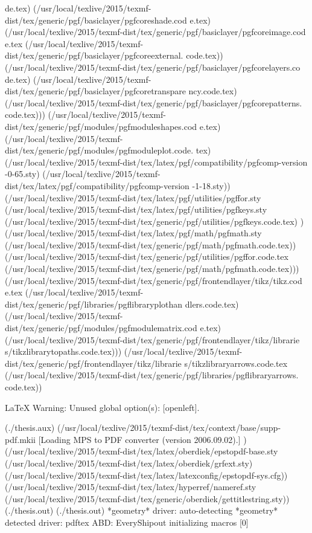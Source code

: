 de.tex)
(/usr/local/texlive/2015/texmf-dist/tex/generic/pgf/basiclayer/pgfcoreshade.cod
e.tex)
(/usr/local/texlive/2015/texmf-dist/tex/generic/pgf/basiclayer/pgfcoreimage.cod
e.tex
(/usr/local/texlive/2015/texmf-dist/tex/generic/pgf/basiclayer/pgfcoreexternal.
code.tex))
(/usr/local/texlive/2015/texmf-dist/tex/generic/pgf/basiclayer/pgfcorelayers.co
de.tex)
(/usr/local/texlive/2015/texmf-dist/tex/generic/pgf/basiclayer/pgfcoretranspare
ncy.code.tex)
(/usr/local/texlive/2015/texmf-dist/tex/generic/pgf/basiclayer/pgfcorepatterns.
code.tex)))
(/usr/local/texlive/2015/texmf-dist/tex/generic/pgf/modules/pgfmoduleshapes.cod
e.tex)
(/usr/local/texlive/2015/texmf-dist/tex/generic/pgf/modules/pgfmoduleplot.code.
tex)
(/usr/local/texlive/2015/texmf-dist/tex/latex/pgf/compatibility/pgfcomp-version
-0-65.sty)
(/usr/local/texlive/2015/texmf-dist/tex/latex/pgf/compatibility/pgfcomp-version
-1-18.sty))
(/usr/local/texlive/2015/texmf-dist/tex/latex/pgf/utilities/pgffor.sty
(/usr/local/texlive/2015/texmf-dist/tex/latex/pgf/utilities/pgfkeys.sty
(/usr/local/texlive/2015/texmf-dist/tex/generic/pgf/utilities/pgfkeys.code.tex)
) (/usr/local/texlive/2015/texmf-dist/tex/latex/pgf/math/pgfmath.sty
(/usr/local/texlive/2015/texmf-dist/tex/generic/pgf/math/pgfmath.code.tex))
(/usr/local/texlive/2015/texmf-dist/tex/generic/pgf/utilities/pgffor.code.tex
(/usr/local/texlive/2015/texmf-dist/tex/generic/pgf/math/pgfmath.code.tex)))
(/usr/local/texlive/2015/texmf-dist/tex/generic/pgf/frontendlayer/tikz/tikz.cod
e.tex
(/usr/local/texlive/2015/texmf-dist/tex/generic/pgf/libraries/pgflibraryplothan
dlers.code.tex)
(/usr/local/texlive/2015/texmf-dist/tex/generic/pgf/modules/pgfmodulematrix.cod
e.tex)
(/usr/local/texlive/2015/texmf-dist/tex/generic/pgf/frontendlayer/tikz/librarie
s/tikzlibrarytopaths.code.tex)))
(/usr/local/texlive/2015/texmf-dist/tex/generic/pgf/frontendlayer/tikz/librarie
s/tikzlibraryarrows.code.tex
(/usr/local/texlive/2015/texmf-dist/tex/generic/pgf/libraries/pgflibraryarrows.
code.tex))

LaTeX Warning: Unused global option(s):
    [openleft].

(./thesis.aux)
(/usr/local/texlive/2015/texmf-dist/tex/context/base/supp-pdf.mkii
[Loading MPS to PDF converter (version 2006.09.02).]
) (/usr/local/texlive/2015/texmf-dist/tex/latex/oberdiek/epstopdf-base.sty
(/usr/local/texlive/2015/texmf-dist/tex/latex/oberdiek/grfext.sty)
(/usr/local/texlive/2015/texmf-dist/tex/latex/latexconfig/epstopdf-sys.cfg))
(/usr/local/texlive/2015/texmf-dist/tex/latex/hyperref/nameref.sty
(/usr/local/texlive/2015/texmf-dist/tex/generic/oberdiek/gettitlestring.sty))
(./thesis.out) (./thesis.out)
*geometry* driver: auto-detecting
*geometry* detected driver: pdftex
ABD: EveryShipout initializing macros [0]

